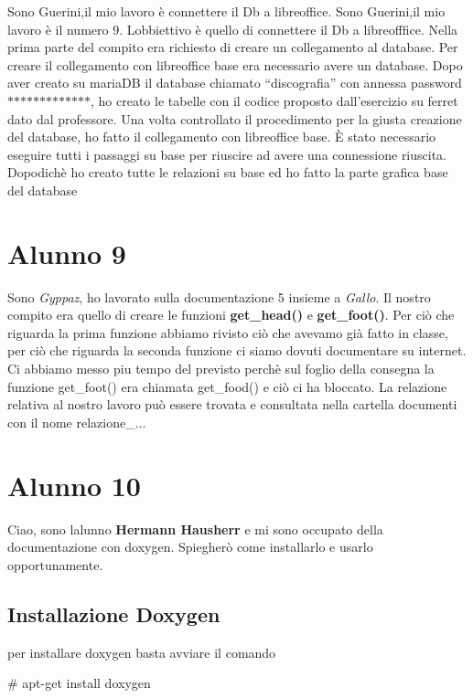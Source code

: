 Sono Guerini,il mio lavoro è connettere il Db a libreoffice. Sono Guerini,il mio lavoro è il numero 9. L\textquotesingle{}obbiettivo è quello di connettere il Db a libreofffice. Nella prima parte del compito era richiesto di creare un collegamento al database. Per creare il collegamento con libreoffice base era necessario avere un database. Dopo aver creato su maria\+DB il database chiamato “discografia” con annessa password $\ast$$\ast$$\ast$$\ast$$\ast$$\ast$$\ast$$\ast$$\ast$$\ast$$\ast$$\ast$$\ast$, ho creato le tabelle con il codice proposto dall’esercizio su ferret dato dal professore. Una volta controllato il procedimento per la giusta creazione del database, ho fatto il collegamento con libreoffice base. È stato necessario eseguire tutti i passaggi su base per riuscire ad avere una connessione riuscita. Dopodichè ho creato tutte le relazioni su base ed ho fatto la parte grafica base del database \section*{Alunno 9}

Sono {\itshape Gyppaz}, ho lavorato sulla documentazione 5 insieme a {\itshape Gallo}. Il nostro compito era quello di creare le funzioni {\bfseries get\+\_\+head()} e {\bfseries get\+\_\+foot()}. Per ciò che riguarda la prima funzione abbiamo rivisto ciò che avevamo già fatto in classe, per ciò che riguarda la seconda funzione ci siamo dovuti documentare su internet. Ci abbiamo messo piu\textquotesingle{} tempo del previsto perchè sul foglio della consegna la funzione get\+\_\+foot() era chiamata get\+\_\+food() e ciò ci ha bloccato. La relazione relativa al nostro lavoro può essere trovata e consultata nella cartella documenti con il nome relazione\+\_... \section*{Alunno 10}

Ciao, sono l\textquotesingle{}alunno {\bfseries Hermann Hausherr} e mi sono occupato della documentazione con doxygen. Spiegherò come installarlo e usarlo opportunamente. \subsection*{Installazione Doxygen}

per installare doxygen basta avviare il comando 
\begin{DoxyCode}
# apt-get install doxygen
\end{DoxyCode}
